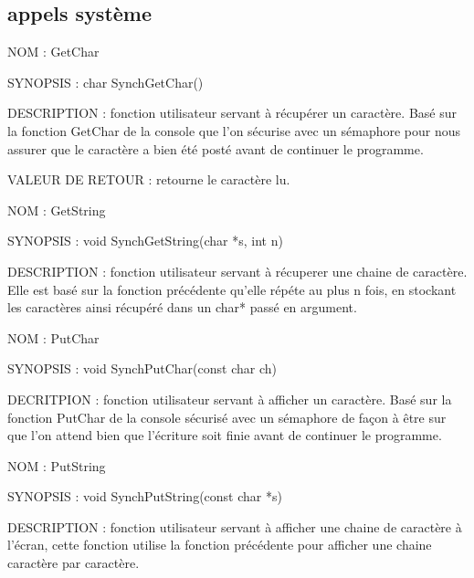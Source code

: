 \documentclass{report}
\begin{document}
	\subsection{appels système}
	\begin{description}
		\item{NOM :} GetChar
		\item{SYNOPSIS : } char SynchGetChar()
		\item{DESCRIPTION :} fonction utilisateur servant à récupérer un caractère. Basé sur la fonction GetChar de la console que l'on sécurise avec un sémaphore pour nous assurer que le caractère a bien été posté avant de continuer le programme.\newline
		\item{VALEUR DE RETOUR : } retourne le caractère lu.
	\end{description}
	\begin{description}
		\item{NOM : } GetString
		\item{SYNOPSIS : } void SynchGetString(char *s, int n)
		\item{DESCRIPTION : } fonction utilisateur servant à récuperer une chaine de caractère. Elle est basé sur la fonction précédente qu'elle répéte au plus n fois, en stockant les caractères ainsi récupéré dans un char* passé en argument.
	\end{description}
	\begin{description}
		\item{NOM : } PutChar
		\item{SYNOPSIS : } void SynchPutChar(const char ch)
		\item{DECRITPION : } fonction utilisateur servant à afficher un caractère. Basé sur la fonction PutChar de la console sécurisé avec un sémaphore de façon à être sur que l'on attend bien que l'écriture soit finie avant de continuer le programme.
	\end{description}
	\begin{description}
		\item{NOM : } PutString
		\item{SYNOPSIS : } void SynchPutString(const char *s)
		\item{DESCRIPTION : } fonction utilisateur servant à afficher une chaine de caractère à l'écran, cette fonction utilise la fonction précédente pour afficher une chaine caractère par caractère.
	\end{description}
\end{document}
